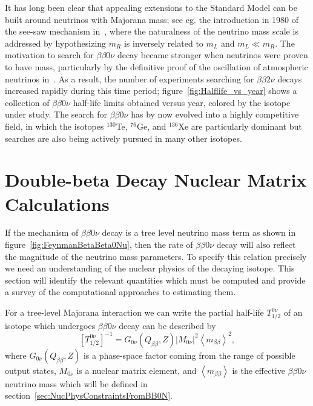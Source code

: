 It has long been clear that appealing extensions to the Standard Model can be built around neutrinos with Majorana mass; see eg. the introduction in 1980 of the see-saw mechanism in~\cite{PhysRevLett.44.912}, where the naturalness of the neutrino mass scale is addressed by hypothesizing $m_R$ is inversely related to $m_L$ and $m_L \ll m_R$.  The motivation to search for $\beta\beta 0\nu$ decay became stronger when neutrinos were proven to have mass, particularly by the definitive proof of the oscillation of atmospheric neutrinos in~\cite{SuperK}.  As a result, the number of experiments searching for $\beta\beta 2\nu$ decays increased rapidly during this time period; figure~\ref{fig:Halflife_vs_year} shows a collection of $\beta\beta 0\nu$ half-life limits obtained versus year, colored by the isotope under study.  The search for $\beta\beta 0\nu$ has by now evolved into a highly competitive field, in which the isotopes $^{130}$Te, $^{76}$Ge, and $^{136}$Xe are particularly dominant but searches are also being actively pursued in many other isotopes.

\section{Double-beta Decay Nuclear Matrix Calculations}\label{sec:NuclearMatrixCalculations}

If the mechanism of $\beta\beta 0\nu$ decay is a tree level neutrino mass term as shown in figure~\ref{fig:FeynmanBetaBeta0Nu}, then the rate of $\beta\beta 0\nu$ decay will also reflect the magnitude of the neutrino mass parameters.  To specify this relation precisely we need an understanding of the nuclear physics of the decaying isotope.  This section will identify the relevant quantities which must be computed and provide a survey of the computational approaches to estimating them.

For a tree-level Majorana interaction we can write the partial half-life $T^{0\nu}_{1/2}$ of an isotope which undergoes $\beta\beta 0\nu$ decay can be described by
\begin{equation}\label{eqn:HalfLifeMatrixElementEqn}
\left[T^{0\nu}_{1/2}\right]^{-1} = G_{0\nu}(Q_{\beta\beta}, Z) \left| M_{0\nu}\right|^2 \left< m_{\beta\beta} \right>^2,
\end{equation}
where $G_{0\nu}(Q_{\beta\beta}, Z)$ is a phase-space factor coming from the range of possible output states, $M_{0\nu}$ is a nuclear matrix element, and $\left< m_{\beta\beta} \right>$ is the effective $\beta\beta 0\nu$ neutrino mass which will be defined in section~\ref{sec:NucPhysConstraintsFromBB0N}.

